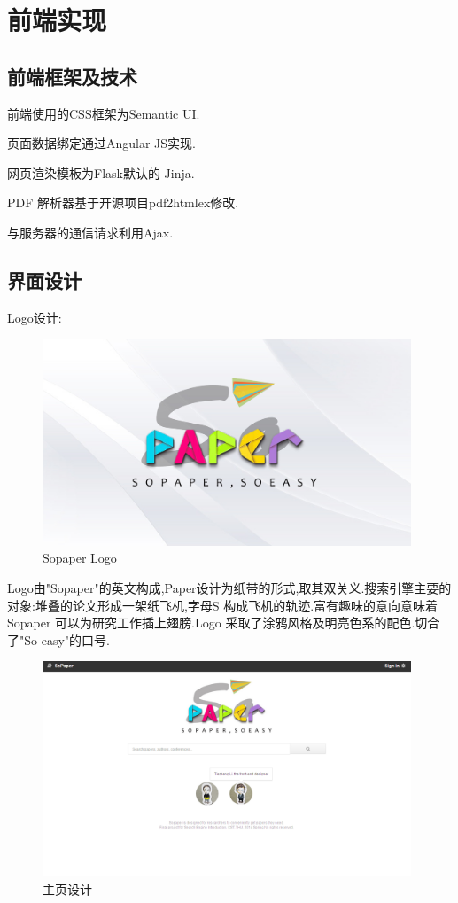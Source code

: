 \section{前端实现}

\subsection{前端框架及技术}

前端使用的CSS框架为Semantic UI.

页面数据绑定通过Angular JS实现.

网页渲染模板为Flask默认的 Jinja.

PDF 解析器基于开源项目pdf2htmlex修改.

与服务器的通信请求利用Ajax.

\subsection{界面设计}

Logo设计:

\begin{figure}[H]
  \small
  \centering
  \includegraphics[width=11cm]{img/Sopaperlogo.jpg}
  \caption{Sopaper Logo}
\end{figure}

Logo由"Sopaper"的英文构成,Paper设计为纸带的形式,取其双关义.搜索引擎主要的对象:堆叠的论文形成一架纸飞机,字母S 构成飞机的轨迹.富有趣味的意向意味着Sopaper 可以为研究工作插上翅膀.Logo 采取了涂鸦风格及明亮色系的配色.切合了"So easy"的口号.

\begin{figure}[H]
  \small
  \centering
  \includegraphics[width=11cm]{img/index.png}
  \caption{主页设计}
\end{figure}

